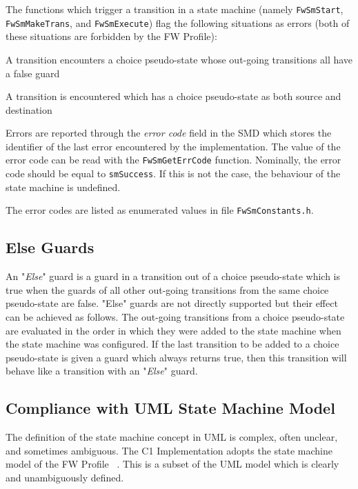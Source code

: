 \documentclass[a4paper,10pt]{article}
\newenvironment{fw_itemize}						%
{\begin{itemize}
  \setlength{\itemsep}{1mm}
  \setlength{\parskip}{0pt}
  \setlength{\parsep}{0pt}}
{\end{itemize}}
\begin{document}
The functions which trigger a transition in a state machine (namely \texttt{FwSmStart}, \texttt{FwSmMakeTrans}, 
and \texttt{FwSmExecute}) flag the following situations as errors (both of these situations are forbidden by the 
FW Profile):

\begin{fw_itemize}
\item A transition encounters a choice pseudo-state whose out-going transitions all have a false guard
\item A transition is encountered which has a choice pseudo-state as both source and destination
\end{fw_itemize}

Errors are reported through the \emph{error code} field in the SMD which stores the identifier of the last 
error encountered by the implementation. The value of the error code can be read with the \texttt{FwSmGetErrCode} 
function. Nominally, the error code should be equal to \texttt{smSuccess}. If this is not the case, the behaviour 
of the state machine is undefined.

The error codes are listed as enumerated values in file \texttt{FwSmConstants.h}.

\subsection{Else Guards}
An "\emph{Else}" guard is a guard in a transition out of a choice pseudo-state which is true when the guards of 
all other out-going transitions from the same choice pseudo-state are false. "Else" guards are not directly 
supported but their effect can be achieved as follows. The out-going transitions from a choice pseudo-state 
are evaluated in the order in which they were added to the state machine when the state machine was configured. 
If the last transition to be added 
to a choice pseudo-state is given a guard which always returns true, then this transition will behave like 
a transition with an "\emph{Else}" guard.


\subsection{Compliance with UML State Machine Model}
The definition of the state machine concept in UML is complex, often unclear, and sometimes ambiguous. 
The C1 Implementation adopts the state machine model of the FW Profile ~\cite{ref:fwprofile}. 
This is a subset of the UML model which is clearly and unambiguously defined. 
\end{document}
